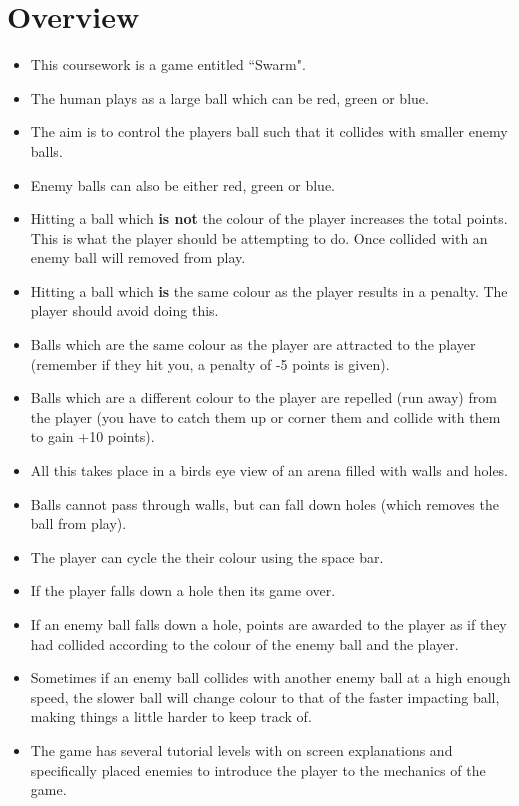 \section{Overview}

\begin{itemize}
	\item This coursework is a game entitled ``Swarm".
	\item The human plays as a large ball which can be red, green or blue.
	\item The aim is to control the players ball such that it collides with smaller enemy balls.
	\item Enemy balls can also be either red, green or blue.
	\item Hitting a ball which {\bf is not} the colour of the player increases the total points. This is what the player should be attempting to do. Once collided with an enemy ball will removed from play.
	\item Hitting a ball which {\bf is} the same colour as the player results in a penalty. The player should avoid doing this.
	\item Balls which are the same colour as the player are attracted to the player (remember if they hit you, a penalty of -5 points is given).
	\item Balls which are a different colour to the player are repelled (run away) from the player (you have to catch them up or corner them and collide with them to gain +10 points).
	\item All this takes place in a birds eye view of an arena filled with walls and holes.
	\item Balls cannot pass through walls, but can fall down holes (which removes the ball from play).
	\item The player can cycle the their colour using the space bar.
	\item If the player falls down a hole then its game over.
	\item If an enemy ball falls down a hole, points are awarded to the player as if they had collided according to the colour of the enemy ball and the player.
	\item Sometimes if an enemy ball collides with another enemy ball at a high enough speed, the slower ball will change colour to that of the faster impacting ball, making things a little harder to keep track of.
	\item The game has several tutorial levels with on screen explanations and specifically placed enemies to introduce the player to the mechanics of the game.

\end{itemize}
